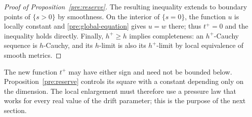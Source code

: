 \begin{proof}[Proof of Proposition~\ref{pre:reserve}]
The resulting inequality extends to boundary points of $\{s>0\}$
by smoothness. On the interior of $\{s=0\}$, the function $u$ is
locally constant and \eqref{pre:global-equation} gives $u=w$ there;
thus $t^+=0$ and the inequality holds directly. Finally, $h^+\ge h$
implies completeness: an $h^+$-Cauchy sequence is $h$-Cauchy, and its
$h$-limit is also its $h^+$-limit by local equivalence of smooth metrics.
\end{proof}

The new function $t^+$ may have either sign and need not be bounded
below. Proposition~\ref{pre:reserve} controls its square with a constant
depending only on the dimension. The local enlargement must therefore
use a pressure law that works for every real value of the drift
parameter; this is the purpose of the next section.
